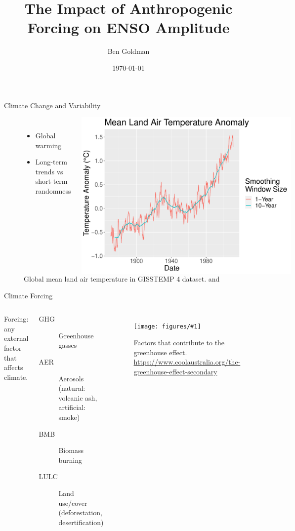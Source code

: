 \documentclass{beamer}
\title{The Impact of Anthropogenic Forcing on ENSO Amplitude}
\author{Ben Goldman}
\date{\today}
\newcommand{\myfig}[4]{
  \begin{figure}
    \centering
    \texttt{[image: figures/\#1]}
    \caption{#2}
    \label{fig:#4}
  \end{figure}
}
\begin{document}
\begin{frame}

  \begin{block}{Climate Change and Variability}
    \begin{figure}
      \begin{columns}
        \begin{itemize}
        \item Global warming
        \item Long-term trends vs short-term randomness
        \end{itemize}
        \caption{Global mean land air temperature in GISSTEMP 4 dataset. \citep{gistemp2019giss} and \citep{lenssen2019improvements}}
        \includegraphics[width=1.0\textwidth]{figures/intro_fig_3.pdf}
      \end{columns}
    \end{figure}
  \end{block}
  \vfill

  \begin{block}{Climate Forcing}
    \begin{columns}
      \alert{Forcing}: any external factor that affects climate.
      \begin{description}
      \item[\alert{GHG}] Greenhouse gasses
      \item[\alert{AER}] Aerosols (natural: volcanic ash, artificial: smoke)
      \item[\alert{BMB}] Biomass burning
      \item[\alert{LULC}] Land use/cover (deforestation, desertification)
      \end{description}
      \myfig{greenhouse_Effect.jpg}{Factors that contribute to the greenhouse effect. \url{https://www.coolaustralia.org/the-greenhouse-effect-secondary}}{1.0}{this}
    \end{columns}
  \end{block}
  \vfill


\end{frame}
\end{document}
